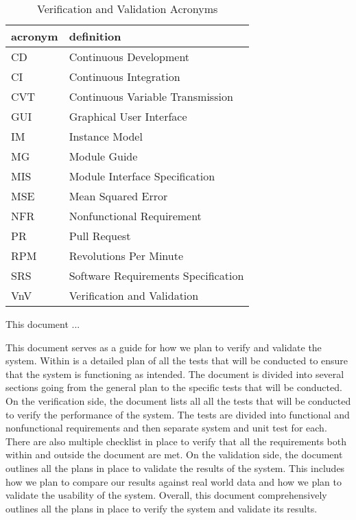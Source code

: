 \documentclass[12pt, titlepage]{article}
\begin{document}
\begin{table}[h] %
  \raggedright
  \begin{tabular}{l l} 
    \toprule		
    \textbf{acronym} & \textbf{definition}\\
    \midrule
    CD & Continuous Development\\
    CI & Continuous Integration\\ 
    CVT & Continuous Variable Transmission\\
    GUI & Graphical User Interface\\
    IM & Instance Model\\
    MG & Module Guide\\
    MIS & Module Interface Specification\\
    MSE & Mean Squared Error\\
    NFR & Nonfunctional Requirement\\
    PR & Pull Request\\
    RPM & Revolutions Per Minute\\
    SRS & Software Requirements Specification\\
    VnV & Verification and Validation\\
    \bottomrule
  \end{tabular}
  \caption{Verification and Validation Acronyms}
  \label{tab:vnv_acronym}
\end{table}



\newpage


This document ... 

\noindent This document serves as a guide for how we plan to verify and validate the \progname{} system.
Within is a detailed plan of all the tests that will be conducted to ensure that the system is functioning as intended.
The document is divided into several sections going from the general plan to the specific tests that will be conducted.
On the verification side, the document lists all all the tests that will be conducted to verify the performance of the system.
The tests are divided into functional and nonfunctional requirements and then separate system and unit test for each.
There are also multiple checklist in place to verify that all the requirements both within and outside the document are met.
On the validation side, the document outlines all the plans in place to validate the results of the system.
This includes how we plan to compare our results against real world data and how we plan to validate the usability of the system.
Overall, this document comprehensively outlines all the plans in place to verify the system and validate its results.
\end{document}
